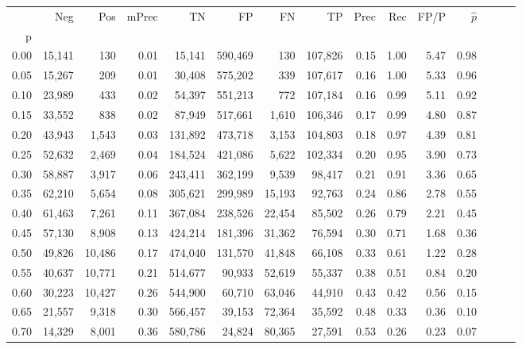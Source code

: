 \begin{tabular}{rrrrrrrrrrrrrrr}
\toprule
{} &     Neg &     Pos & mPrec &       TN &       FP &       FN &       TP &  Prec &   Rec &  FP/P & $\hat{p}$ \\
p    &         &         &       &          &          &          &          &       &       &       &           \\
\midrule
0.00 &  15,141 &     130 &  0.01 &   15,141 &  590,469 &      130 &  107,826 &  0.15 &  1.00 &  5.47 &      0.98 \\
0.05 &  15,267 &     209 &  0.01 &   30,408 &  575,202 &      339 &  107,617 &  0.16 &  1.00 &  5.33 &      0.96 \\
0.10 &  23,989 &     433 &  0.02 &   54,397 &  551,213 &      772 &  107,184 &  0.16 &  0.99 &  5.11 &      0.92 \\
0.15 &  33,552 &     838 &  0.02 &   87,949 &  517,661 &    1,610 &  106,346 &  0.17 &  0.99 &  4.80 &      0.87 \\
0.20 &  43,943 &   1,543 &  0.03 &  131,892 &  473,718 &    3,153 &  104,803 &  0.18 &  0.97 &  4.39 &      0.81 \\
0.25 &  52,632 &   2,469 &  0.04 &  184,524 &  421,086 &    5,622 &  102,334 &  0.20 &  0.95 &  3.90 &      0.73 \\
0.30 &  58,887 &   3,917 &  0.06 &  243,411 &  362,199 &    9,539 &   98,417 &  0.21 &  0.91 &  3.36 &      0.65 \\
0.35 &  62,210 &   5,654 &  0.08 &  305,621 &  299,989 &   15,193 &   92,763 &  0.24 &  0.86 &  2.78 &      0.55 \\
0.40 &  61,463 &   7,261 &  0.11 &  367,084 &  238,526 &   22,454 &   85,502 &  0.26 &  0.79 &  2.21 &      0.45 \\
0.45 &  57,130 &   8,908 &  0.13 &  424,214 &  181,396 &   31,362 &   76,594 &  0.30 &  0.71 &  1.68 &      0.36 \\
0.50 &  49,826 &  10,486 &  0.17 &  474,040 &  131,570 &   41,848 &   66,108 &  0.33 &  0.61 &  1.22 &      0.28 \\
0.55 &  40,637 &  10,771 &  0.21 &  514,677 &   90,933 &   52,619 &   55,337 &  0.38 &  0.51 &  0.84 &      0.20 \\
0.60 &  30,223 &  10,427 &  0.26 &  544,900 &   60,710 &   63,046 &   44,910 &  0.43 &  0.42 &  0.56 &      0.15 \\
0.65 &  21,557 &   9,318 &  0.30 &  566,457 &   39,153 &   72,364 &   35,592 &  0.48 &  0.33 &  0.36 &      0.10 \\
0.70 &  14,329 &   8,001 &  0.36 &  580,786 &   24,824 &   80,365 &   27,591 &  0.53 &  0.26 &  0.23 &      0.07 \\

\end{tabular}
